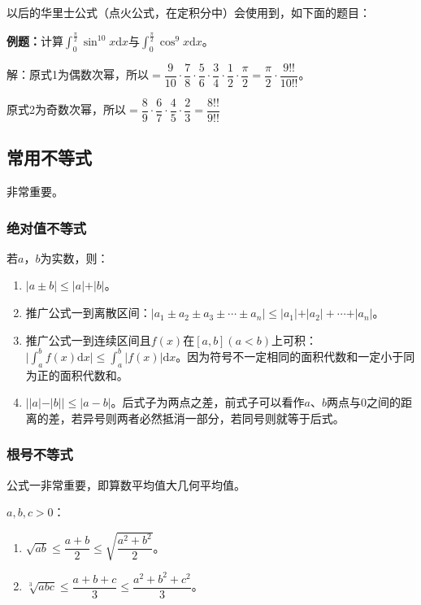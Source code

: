 以后的华里士公式（点火公式，在定积分中）会使用到，如下面的题目：

\textbf{例题：}计算$\int_0^{\frac{\pi}{2}}\sin^{10}x\textrm{d}x$与$\int_0^{\frac{\pi}{2}}\cos^9x\textrm{d}x$。\medskip

解：原式1为偶数次幂，所以$=\dfrac{9}{10}\cdot\dfrac{7}{8}\cdot\dfrac{5}{6}\cdot\dfrac{3}{4}\cdot\dfrac{1}{2}\cdot\dfrac{\pi}{2}=\dfrac{\pi}{2}\cdot\dfrac{9!!}{10!!}$。\medskip

原式2为奇数次幂，所以$=\dfrac{8}{9}\cdot\dfrac{6}{7}\cdot\dfrac{4}{5}\cdot\dfrac{2}{3}=\dfrac{8!!}{9!!}$

\subsection{常用不等式}

非常重要。

\subsubsection{绝对值不等式}

若$a$，$b$为实数，则：

\begin{enumerate}
    \item $\vert a\pm b\vert\leqslant\vert a\vert+\vert b\vert$。
    \item 推广公式一到离散区间：$\vert a_1\pm a_2\pm a_3\pm\cdots\pm a_n\vert\leqslant\vert a_1\vert+\vert a_2\vert+\cdots+\vert a_n\vert$。
    \item 推广公式一到连续区间且$f(x)$在$[a,b](a<b)$上可积：$\vert\int_a^bf(x)\textrm{d}x\vert\leqslant\int_a^b\vert f(x)\vert\textrm{d}x$。因为符号不一定相同的面积代数和一定小于同为正的面积代数和。
    \item $\vert\vert a\vert-\vert b\vert\vert\leqslant\vert a-b\vert$。后式子为两点之差，前式子可以看作$a$、$b$两点与0之间的距离的差，若异号则两者必然抵消一部分，若同号则就等于后式。
\end{enumerate}



\subsubsection{根号不等式}

公式一非常重要，即算数平均值大几何平均值。

$a,b,c>0$：

\begin{enumerate}
    \item $\sqrt{ab}\leqslant\dfrac{a+b}{2}\leqslant\sqrt{\dfrac{a^2+b^2}{2}}$。
    \item $\sqrt[3]{abc}\leqslant\dfrac{a+b+c}{3}\leqslant\dfrac{a^2+b^2+c^2}{3}$。
\end{enumerate}

